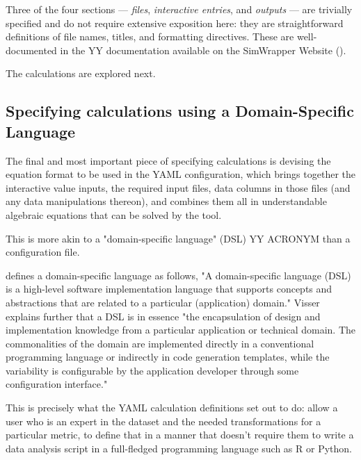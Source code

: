 Three of the four sections --- \emph{files}, \emph{interactive entries}, and \emph{outputs} --- are trivially specified and do not require extensive exposition here: they are straightforward definitions of file names, titles, and formatting directives. These are well-documented in the YY documentation available on the SimWrapper Website (\cite{SimWrapperWebsite}).

The calculations are explored next.

\hypertarget{calculation-tables-dsl}{%
\subsection{Specifying calculations using a Domain-Specific Language}\label{calculation-tables-dsl}}

The final and most important piece of specifying calculations is devising the equation format to be used in the YAML configuration, which brings together the interactive value inputs, the required input files, data columns in those files (and any data manipulations thereon), and combines them all in understandable algebraic equations that can be solved by the tool.

This is more akin to a "domain-specific language" (DSL) YY ACRONYM than a configuration file.

\cite{Visser2008} defines a domain-specific language as follows, "A domain-specific language (DSL) is a high-level software implementation language that supports concepts and abstractions that are related to a particular (application) domain." Visser explains further that a DSL is in essence "the encapsulation of design and implementation knowledge from a particular application or technical domain. The commonalities of the domain are implemented directly in a conventional programming language or indirectly in code generation templates, while the variability is configurable by the application developer through some configuration interface."

This is precisely what the YAML calculation definitions set out to do: allow a user who is an expert in the dataset and the needed transformations for a particular metric, to define that in a manner that doesn't require them to write a data analysis script in a full-fledged programming language such as R or Python.

